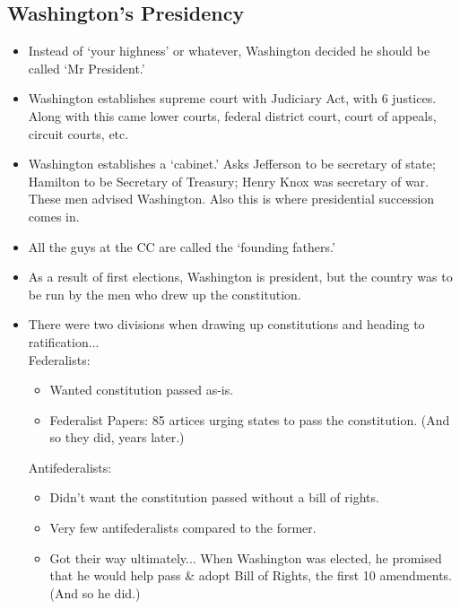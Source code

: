 \documentclass{article}
\begin{document}
  \subsection{Washington's Presidency}
    \begin{itemize}
      \item Instead of `your highness' or whatever, Washington decided he should be called `Mr President.'
      \item Washington establishes supreme court with Judiciary Act, with 6 justices. Along with this came lower courts, federal district court, court of appeals, circuit courts, etc.
      \item Washington establishes a `cabinet.' Asks Jefferson to be secretary of state; Hamilton to be Secretary of Treasury; Henry Knox was secretary of war. These men advised Washington. Also this is where presidential succession comes in.
      \item All the guys at the CC are called the `founding fathers.'
      \item As a result of first elections, Washington is president, but the country was to be run by the men who drew up the constitution.
      \item There were two divisions when drawing up constitutions and heading to ratification... \\
        Federalists:
        \begin{itemize}
          \item Wanted constitution passed as-is.
          \item Federalist Papers: 85 artices urging states to pass the constitution. (And so they did, years later.)
        \end{itemize}
        Antifederalists:
        \begin{itemize}
        \item Didn't want the constitution passed without a bill of rights.
        \item Very few antifederalists compared to the former.
        \item Got their way ultimately... When Washington was elected, he promised that he would help pass \& adopt Bill of Rights, the first 10 amendments. (And so he did.)
        \end{itemize}
      \end{itemize}
\end{document}

